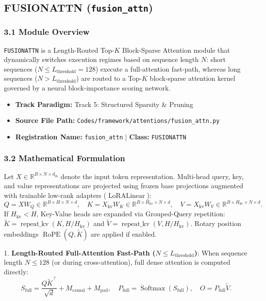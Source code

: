 \subsection{FUSIONATTN (\texttt{fusion\_attn})}
\label{sec:app_module_fusion_attn}

\subsubsection*{3.1 Module Overview}
\texttt{FUSIONATTN} is a Length-Routed Top-$K$ Block-Sparse Attention module that dynamically switches execution regimes based on sequence length $N$: short sequences ($N \le L_{\text{threshold}} = 128$) execute a full-attention fast-path, whereas long sequences ($N > L_{\text{threshold}}$) are routed to a Top-$K$ block-sparse attention kernel governed by a neural block-importance scoring network.
\begin{itemize}
    \item \textbf{Track Paradigm:} Track 5: Structured Sparsity \& Pruning
    \item \textbf{Source File Path:} \texttt{Codes/framework/attentions/fusion\_attn.py}
    \item \textbf{Registration Name:} \texttt{fusion\_attn} $\mid$ \textbf{Class:} \texttt{FUSIONATTN}
\end{itemize}

\subsubsection*{3.2 Mathematical Formulation}
Let $X \in \mathbb{R}^{B \times N \times d_{\text{in}}}$ denote the input token representation. Multi-head query, key, and value representations are projected using frozen base projections augmented with trainable low-rank adapters ($\operatorname{LoRALinear}$):
\begin{equation}
Q = X W_Q \in \mathbb{R}^{B \times H \times N \times d}, \quad K = X_{\text{kv}} W_K \in \mathbb{R}^{B \times H_{\text{kv}} \times N \times d}, \quad V = X_{\text{kv}} W_V \in \mathbb{R}^{B \times H_{\text{kv}} \times N \times d}.
\end{equation}
If $H_{\text{kv}} < H$, Key-Value heads are expanded via Grouped-Query repetition: $\widetilde{K} = \operatorname{repeat\_kv}(K, H/H_{\text{kv}})$ and $\widetilde{V} = \operatorname{repeat\_kv}(V, H/H_{\text{kv}})$. Rotary position embeddings $\operatorname{RoPE}(Q, \widetilde{K})$ are applied if enabled.

1. \textbf{Length-Routed Full-Attention Fast-Path ($N \le L_{\text{threshold}}$)}:
When sequence length $N \le 128$ (or during cross-attention), full dense attention is computed directly:
\begin{equation}
S_{\text{full}} = \frac{Q \widetilde{K}^\top}{\sqrt{d}} + M_{\text{causal}} + M_{\text{pad}}, \quad P_{\text{full}} = \operatorname{Softmax}(S_{\text{full}}), \quad O = P_{\text{full}} \widetilde{V}.
\end{equation}

